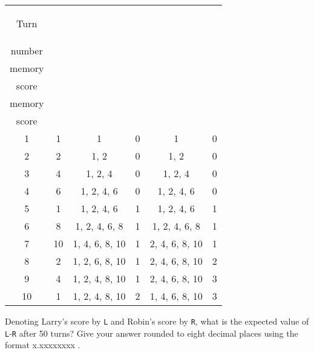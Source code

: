 \begin{longtable}[]{@{}cccccc@{}}
\toprule
\begin{minipage}[b]{0.1\linewidth}\raggedright
\begin{center}Turn\end{center}
\end{minipage} & \begin{minipage}[b]{0.1\linewidth}\raggedright
\begin{center}Called\\number\end{center}
\end{minipage} & \begin{minipage}[b]{0.15\linewidth}\raggedright
\begin{center}Larry's\\memory\end{center}
\end{minipage} & \begin{minipage}[b]{0.1\linewidth}\raggedright
\begin{center}Larry's\\score\end{center}
\end{minipage} & \begin{minipage}[b]{0.15\linewidth}\raggedright
\begin{center}Robin's\\memory\end{center}
\end{minipage} & \begin{minipage}[b]{0.1\linewidth}\raggedright
\begin{center}Robin's\\score\end{center}
\end{minipage} \\
\midrule
\endhead
1 & 1 & 1 & 0 & 1 & 0 \\
2 & 2 & 1, 2 & 0 & 1, 2 & 0 \\
3 & 4 & 1, 2, 4 & 0 & 1, 2, 4 & 0 \\
4 & 6 & 1, 2, 4, 6 & 0 & 1, 2, 4, 6 & 0 \\
5 & 1 & 1, 2, 4, 6 & 1 & 1, 2, 4, 6 & 1 \\
6 & 8 & 1, 2, 4, 6, 8 & 1 & 1, 2, 4, 6, 8 & 1 \\
7 & 10 & 1, 4, 6, 8, 10 & 1 & 2, 4, 6, 8, 10 & 1 \\
8 & 2 & 1, 2, 6, 8, 10 & 1 & 2, 4, 6, 8, 10 & 2 \\
9 & 4 & 1, 2, 4, 8, 10 & 1 & 2, 4, 6, 8, 10 & 3 \\
10 & 1 & 1, 2, 4, 8, 10 & 2 & 1, 4, 6, 8, 10 & 3 \\
\bottomrule
\end{longtable}

Denoting Larry's score by \texttt{L} and Robin's score by \texttt{R},
what is the expected value of \textbar{}\texttt{L}-\texttt{R}\textbar{}
after 50 turns? Give your answer rounded to eight decimal places using
the format x.xxxxxxxx .